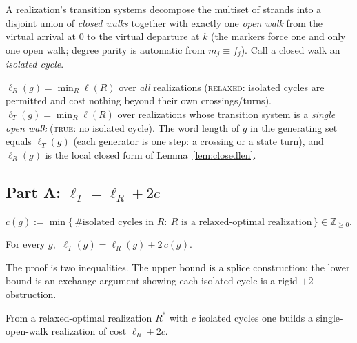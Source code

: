 A realization's transition systems decompose the multiset of strands into a disjoint union of
\emph{closed walks} together with exactly one \emph{open walk} from the virtual arrival at $0$ to the
virtual departure at $k$ (the markers force one and only one open walk; degree parity is automatic
from $m_j\equiv f_j$). Call a closed walk an \emph{isolated cycle}.

\begin{definition}\label{def:metrics}
$\ell_R(g)=\min_R\ell(R)$ over \emph{all} realizations (\textsc{relaxed}: isolated cycles are
permitted and cost nothing beyond their own crossings/turns). $\ell_T(g)=\min_R\ell(R)$ over
realizations whose transition system is a \emph{single open walk} (\textsc{true}: no isolated cycle).
The word length of $g$ in the generating set equals $\ell_T(g)$ (each generator is one step:
a crossing or a state turn), and $\ell_R(g)$ is the local closed form of Lemma~\ref{lem:closedlen}.
\end{definition}

\subsection{Part A: \texorpdfstring{$\ell_T=\ell_R+2c$}{ellT = ellR + 2c}}

\begin{definition}\label{def:c}
$c(g):=\min\{\,\#\text{isolated cycles in }R:\ R\text{ is a relaxed-optimal realization}\,\}\in\mathbb Z_{\ge0}.$
\end{definition}

\begin{theorem}\label{thm:metric}
For every $g$, $\ \ell_T(g)=\ell_R(g)+2\,c(g).$
\end{theorem}

The proof is two inequalities. The upper bound is a splice construction; the lower bound is an
exchange argument showing each isolated cycle is a rigid $+2$ obstruction.

\begin{lemma}\label{lem:splice}
From a relaxed-optimal realization $R^\ast$ with $c$ isolated cycles one builds a single-open-walk
realization of cost $\ell_R+2c$.
\end{lemma}

